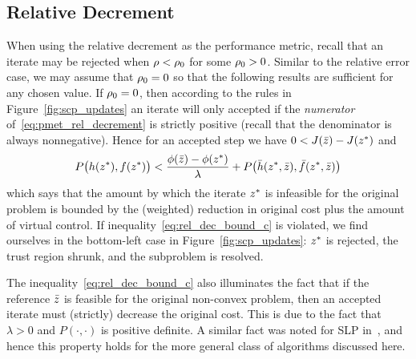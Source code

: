 \documentclass[letterpaper, 10 pt, conference]{ieeeconf}
\begin{document}
\subsection{Relative Decrement}\label{subsec:crepp_rel_dec}

When using the relative decrement as the performance metric, recall that an iterate may be rejected when $\rho<\rho_0$ for some $\rho_0>0$. Similar to the relative error case, we may assume that $\rho_0=0$ so that the following results are sufficient for any chosen value. If $\rho_0=0$, then according to the rules in Figure~\ref{fig:scp_updates} an iterate will only accepted if the \textit{numerator} of~\eqref{eq:pmet_rel_decrement} is strictly positive (recall that the denominator is always nonnegative). Hence for an accepted step we have $0 < J(\bar{z}) - J(z^*)$ and
\begin{equation}
 P\big( h(z^*),f(z^*) \big) < \frac{\phi(\bar{z}) - \phi(z^*)}{\lambda} + P\big(\bar{h}(z^*,\bar{z}),\bar{f}(z^*,\bar{z})\big) \label{eq:rel_dec_bound_c}
\end{equation}
which says that the amount by which the iterate $z^*$ is infeasible for the original problem is bounded by the (weighted) reduction in original cost plus the amount of virtual control. If inequality~\eqref{eq:rel_dec_bound_c} is violated, we find ourselves in the bottom-left case in Figure~\ref{fig:scp_updates}: $z^*$ is rejected, the trust region shrunk, and the subproblem is resolved. 

\begin{remark}
The inequality~\eqref{eq:rel_dec_bound_c} also illuminates the fact that if the reference $\bar{z}$ is feasible for the original non-convex problem, then an accepted iterate must (strictly) decrease the original cost. This is due to the fact that $\lambda>0$ and $P(\cdot,\cdot)$ is positive definite. A similar fact was noted for SLP in~\cite{Palacios-Gomez1982}, and hence this property holds for the more general class of algorithms discussed here.
\end{remark}
%
\end{document}
